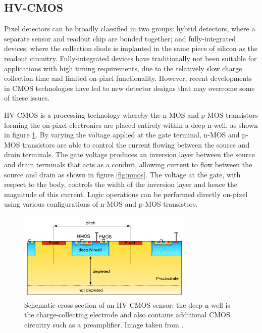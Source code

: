 \subsection{HV-CMOS}

Pixel detectors can be broadly classified in two groups: hybrid detectors, where a separate sensor and readout chip are bonded together; and fully-integrated devices, where the collection diode is implanted in the same piece of silicon as the readout circuitry.  Fully-integrated devices have traditionally not been suitable for applications with high timing requirements, due to the relatively slow charge collection time and limited on-pixel functionality.  However, recent developments in CMOS technologies have led to new detector designs that may overcome some of these issues. 

HV-CMOS is a processing technology whereby the n-MOS and p-MOS transistors forming the on-pixel electronics are placed entirely within a deep n-well, as shown in figure \ref{fig:hvcmos}.  By varying the voltage applied at the gate terminal, n-MOS and p-MOS transistors are able to control the current flowing between the source and drain terminals.  The gate voltage produces an inversion layer between the source and drain terminals that acts as a conduit, allowing current to flow between the source and drain as shown in figure \ref{fig:nmos}.  The voltage at the gate, with respect to the body, controls the width of the inversion layer and hence the magnitude of this current.  Logic operations can be performed directly on-pixel using various configurations of n-MOS and p-MOS transistors.

\begin{figure}[h!]
\centering
\includegraphics[width=0.75\textwidth]{CLICdpVertex/Plots/HV-CMOSDiagram.png}
\caption[Schematic cross section of an HV-CMOS sensor: the deep n-well is the charge-collecting electrode and also contains additional CMOS circuitry such as a preamplifier.  Image taken from \cite{Benoit:2016vup}.]{Schematic cross section of an HV-CMOS sensor: the deep n-well is the charge-collecting electrode and also contains additional CMOS circuitry such as a preamplifier.  Image taken from \cite{Benoit:2016vup}.}\micro
\label{fig:hvcmos}
\end{figure}

